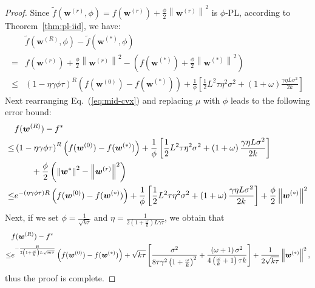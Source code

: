 \documentclass[twoside]{article}
\begin{document}
\begin{proof}
Since $\tilde{f}(\boldsymbol{w}^{(r)},\phi)=f(\boldsymbol{w}^{(r)})+\frac{\phi}{2}\left\|\boldsymbol{w}^{(r)}\right\|^2$ is $\phi$-PL, according to Theorem~\ref{thm:pl-iid}, we have:
\begin{align}
   & \tilde{f}(\boldsymbol{w}^{(R)},\phi)-\tilde{f}(\boldsymbol{w}^{(*)},\phi)\nonumber\\
   =&{f}(\boldsymbol{w}^{(r)})+\frac{\phi}{2}\left\|\boldsymbol{w}^{(r)}\right\|^2-\left({f}(\boldsymbol{w}^{(*)})+\frac{\phi}{2}\left\|\boldsymbol{w}^{(*)}\right\|^2\right)\nonumber\\
    \leq& \left(1-\eta\gamma{\phi\tau}\right)^R\left(f(\boldsymbol{w}^{(0)})-f(\boldsymbol{w}^{(*)})\right)+\frac{1}{{\phi}}\left[\frac{1}{2} L^2\tau\eta^2\sigma^2+\left(1+\omega\right)\frac{\gamma\eta L\sigma^2}{2k}\right]\label{eq:mid-cvx}
\end{align}
Next rearranging Eq.~(\ref{eq:mid-cvx}) and replacing $\mu$ with $\phi$ leads to the following error bound:
\begin{align}\notag
  &  {f}(\boldsymbol{w}^{(R)})-f^*\\\notag
  \leq& \left(1-\eta\gamma{\phi\tau}\right)^R\left(f(\boldsymbol{w}^{(0)})-f(\boldsymbol{w}^{(*)})\right)+\frac{1}{{\phi}}\left[\frac{1}{2} L^2\tau\eta^2\sigma^2+\left(1+\omega\right)\frac{\gamma\eta L\sigma^2}{2k}\right]\\\notag
  &\qquad +\frac{\phi}{2}\left(\left\|\boldsymbol{w}^*\right\|^2-\left\|\boldsymbol{w}^{(r)}\right\|^2\right)\\\notag
    \leq& e^{-\left(\eta\gamma{\phi\tau}\right)R}\left(f(\boldsymbol{w}^{(0)})-f(\boldsymbol{w}^{(*)})\right)+\frac{1}{{\phi}}\left[\frac{1}{2} L^2\tau\eta^2\sigma^2+\left(1+\omega\right)\frac{\gamma\eta L\sigma^2}{2k}\right] +\frac{\phi}{2}\left\|\boldsymbol{w}^{(*)}\right\|^2 
\end{align}
Next, if we set $\phi=\frac{1}{\sqrt{k\tau}}$ and $\eta=\frac{1}{2\left(1+\frac{\omega}{k}\right)L\gamma \tau}$, we obtain that
\begin{align}\notag
        &{f}(\boldsymbol{w}^{(R)})-f^*\\\notag
        \leq& e^{-\frac{R}{2\left(1+\frac{\omega}{k}\right)L \sqrt{m\tau}}}\left(f(\boldsymbol{w}^{(0)})-f(\boldsymbol{w}^{(*)})\right)+\sqrt{k\tau}\left[\frac{\sigma^2}{8\tau\gamma^2\left(1+\frac{\omega}{k}\right)^2} +\frac{\left(\omega+1\right)\sigma^2}{4\left(\frac{\omega}{k}+1\right)\tau k}\right] +\frac{1}{2\sqrt{k\tau}}\left\|\boldsymbol{w}^{(*)}\right\|^2 ,
\end{align}
thus the proof is complete. 
\end{proof}
\end{document}
